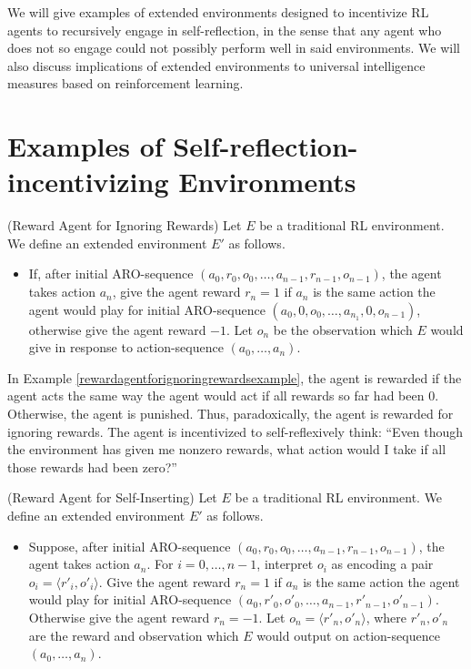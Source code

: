 \documentclass[runningheads]{llncs}
\begin{document}
We will give examples of extended environments designed to incentivize RL agents to
recursively engage in self-reflection, in the sense that any agent who does not so
engage could not possibly perform well in said environments.
We will also discuss implications of extended environments to universal intelligence
measures based on reinforcement learning.

\section{Examples of Self-reflection-incentivizing Environments}

\begin{example}
\label{rewardagentforignoringrewardsexample}
    (Reward Agent for Ignoring Rewards) Let $E$ be a traditional RL environment.
    We define an extended environment $E'$ as follows.
    \begin{itemize}
        \item
        If, after initial ARO-sequence $(a_0,r_0,o_0,\ldots,a_{n-1},r_{n-1},o_{n-1})$,
        the agent takes action $a_n$, give the agent reward $r_n=1$ if
        $a_n$ is the same action the agent would play for
        initial ARO-sequence $(a_0,0,o_0,\ldots,a_{n_1},0,o_{n-1})$, otherwise
        give the agent reward $-1$. Let $o_n$ be the observation which $E$ would
        give in response to action-sequence $(a_0,\ldots,a_n)$.
    \end{itemize}
\end{example}

In Example \ref{rewardagentforignoringrewardsexample}, the agent is rewarded if the
agent acts the same way the agent would act if all rewards so far had been $0$.
Otherwise, the agent is punished. Thus, paradoxically, the agent is rewarded for
ignoring rewards. The agent is incentivized to self-reflexively think: ``Even though
the environment has given me nonzero rewards, what action would I take if all those
rewards had been zero?''

\begin{example}
\label{selfinsertionexample}
    (Reward Agent for Self-Inserting)
    Let $E$ be a traditional RL environment. We define an extended environment $E'$
    as follows.
    \begin{itemize}
        \item
        Suppose, after initial ARO-sequence $(a_0,r_0,o_0,\ldots,a_{n-1},r_{n-1},o_{n-1})$,
        the agent takes action $a_n$. For $i=0,\ldots,n-1$, interpret $o_i$ as
        encoding a pair $o_i=\langle r'_i,o'_i\rangle$.
        Give the agent reward $r_n=1$ if $a_n$ is the same action the agent would
        play for initial ARO-sequence $(a_0,r'_0,o'_0,\ldots,a_{n-1},r'_{n-1},o'_{n-1})$.
        Otherwise give the agent reward $r_n=-1$.
        Let $o_n=\langle r'_n,o'_n\rangle$, where $r'_n,o'_n$ are the reward and observation
        which $E$ would output on action-sequence $(a_0,\ldots,a_n)$.
    \end{itemize} 
\end{example}
\end{document}
